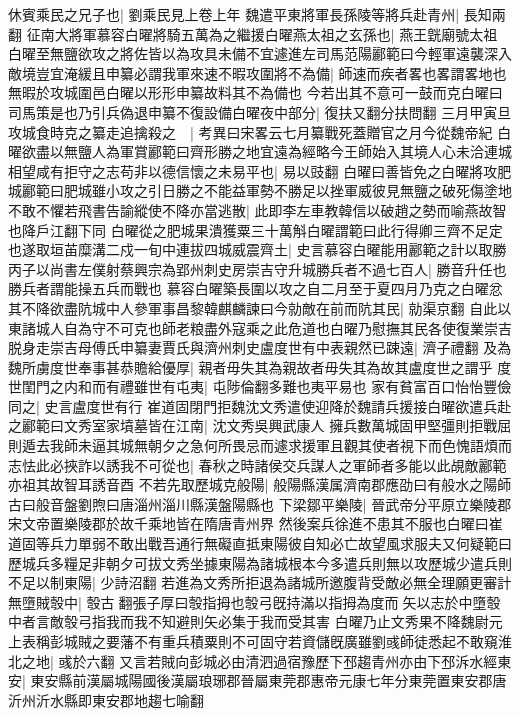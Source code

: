 休賓乘民之兄子也|{
	劉乘民見上卷上年}
魏遣平東將軍長孫陵等將兵赴青州|{
	長知兩翻}
征南大將軍慕容白曜將騎五萬為之繼援白曜燕太祖之玄孫也|{
	燕王皝廟號太祖}
白曜至無鹽欲攻之將佐皆以為攻具未備不宜遽進左司馬范陽酈範曰今輕軍遠襲深入敵境豈宜淹緩且申纂必謂我軍來速不暇攻圍將不為備|{
	師速而疾者畧也畧謂畧地也無暇於攻城圍邑白曜以形形申纂故料其不為備也}
今若出其不意可一鼓而克白曜曰司馬策是也乃引兵偽退申纂不復設備白曜夜中部分|{
	復扶又翻分扶問翻}
三月甲寅旦攻城食時克之纂走追擒殺之　|{
	考異曰宋畧云七月纂戰死蓋贈官之月今從魏帝紀}
白曜欲盡以無鹽人為軍賞酈範曰齊形勝之地宜遠為經略今王師始入其境人心未洽連城相望咸有拒守之志苟非以德信懷之未易平也|{
	易以豉翻}
白曜曰善皆免之白曜將攻肥城酈範曰肥城雖小攻之引日勝之不能益軍勢不勝足以挫軍威彼見無鹽之破死傷塗地不敢不懼若飛書告諭縱使不降亦當逃散|{
	此即李左車教韓信以破趙之勢而喻燕故智也降戶江翻下同}
白曜從之肥城果潰獲粟三十萬斛白曜謂範曰此行得卿三齊不足定也遂取垣苖糜溝二戍一旬中連拔四城威震齊土|{
	史言慕容白曜能用酈範之計以取勝}
丙子以尚書左僕射蔡興宗為郢州刺史房崇吉守升城勝兵者不過七百人|{
	勝音升任也勝兵者謂能操五兵而戰也}
慕容白曜築長圍以攻之自二月至于夏四月乃克之白曜忿其不降欲盡阬城中人參軍事昌黎韓麒麟諫曰今勍敵在前而阬其民|{
	勍渠京翻}
自此以東諸城人自為守不可克也師老粮盡外寇乘之此危道也白曜乃慰撫其民各使復業崇吉脱身走崇吉母傅氏申纂妻賈氏與濟州刺史盧度世有中表親然已踈遠|{
	濟子禮翻}
及為魏所虜度世奉事甚恭贍給優厚|{
	親者毋失其為親故者毋失其為故其盧度世之謂乎}
度世閨門之内和而有禮雖世有屯夷|{
	屯陟倫翻多難也夷平易也}
家有貧富百口怡怡豐儉同之|{
	史言盧度世有行}
崔道固閉門拒魏沈文秀遣使迎降於魏請兵援接白曜欲遣兵赴之酈範曰文秀室家墳墓皆在江南|{
	沈文秀吳興武康人}
擁兵數萬城固甲堅彊則拒戰屈則遁去我師未逼其城無朝夕之急何所畏忌而遽求援軍且觀其使者視下而色愧語煩而志怯此必挾詐以誘我不可從也|{
	春秋之時諸侯交兵謀人之軍師者多能以此覘敵酈範亦祖其故智耳誘音酉}
不若先取歷城克般陽|{
	般陽縣漢属濟南郡應劭曰有般水之陽師古曰般音盤劉煦曰唐淄州淄川縣漢盤陽縣也}
下梁鄒平樂陵|{
	晉武帝分平原立樂陵郡宋文帝置樂陵郡於故千乘地皆在隋唐青州界}
然後案兵徐進不患其不服也白曜曰崔道固等兵力單弱不敢出戰吾通行無礙直抵東陽彼自知必亡故望風求服夫又何疑範曰歷城兵多糧足非朝夕可拔文秀坐據東陽為諸城根本今多遣兵則無以攻歷城少遣兵則不足以制東陽|{
	少詩沼翻}
若進為文秀所拒退為諸城所邀腹背受敵必無全理願更審計無墮賊彀中|{
	彀古翻張子厚曰彀指拇也彀弓旣持滿以指拇為度而矢以志於中墮彀中者言敵彀弓指我而我不知避則矢必集于我而受其害}
白曜乃止文秀果不降魏尉元上表稱彭城賊之要藩不有重兵積粟則不可固守若資儲旣廣雖劉彧師徒悉起不敢窺淮北之地|{
	彧於六翻}
又言若賊向彭城必由清泗過宿豫歷下邳趨青州亦由下邳泝水經東安|{
	東安縣前漢屬城陽國後漢屬琅琊郡晉屬東莞郡惠帝元康七年分東莞置東安郡唐沂州沂水縣即東安郡地趨七喻翻}
